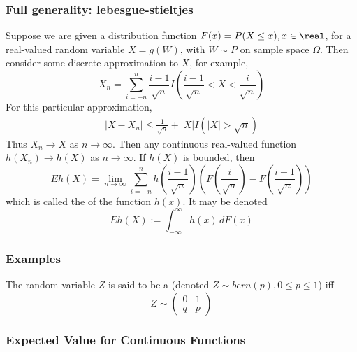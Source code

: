 \documentclass[11pt]{article}
\numberwithin{equation}{section}
\begin{document}
\subsubsection{Full generality: lebesgue-stieltjes}
Suppose we are given a distribution function $F(x) = P(X \leq x), x \in \real$, for a real-valued random variable $X = g(W)$, with $W \sim P$ on sample space $\Omega$. Then consider some discrete approximation to $X$, for example,
\begin{equation}
	X_n = \sum_{i = -n}^n \frac{i-1}{\sqrt{n}}I\left(\frac{i-1}{\sqrt{n}} < X < \frac{i}{\sqrt{n}}\right)
\end{equation}
For this particular approximation,
\begin{align}
	|X - X_n| \leq \frac{1}{\sqrt{n}} + |X|I(|X| > \sqrt{n})
\end{align}
Thus $X_n \rightarrow X$ as $n \rightarrow \infty$. Then any continuous real-valued function $h(X_n) \rightarrow h(X)$ as $n \rightarrow \infty$. If $h(X)$ is bounded, then
\begin{equation}
	Eh(X) = \lim_{n \rightarrow \infty} \sum_{i = -n}^n h(\frac{i-1}{\sqrt{n}})\left(F(\frac{i}{\sqrt{n}}) - F(\frac{i-1}{\sqrt{n}})\right)
\end{equation}
which is called the  of the function $h(x)$. It may be denoted
\begin{equation}
	Eh(X) := \int_{-\infty}^\infty h(x)\,dF(x)
\end{equation}

\subsubsection{Examples}
The random variable $Z$ is said to be a  (denoted $Z \sim bern(p), 0 \leq p \leq 1$) iff
$$Z \sim \begin{pmatrix}
	0 & 1 \\
	q & p
\end{pmatrix}$$

\subsubsection{Expected Value for Continuous Functions}
\end{document}
